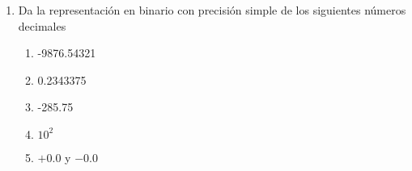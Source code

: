 \documentclass[11pt]{article}
\begin{document}
\begin{enumerate}
\begin{enumerate}
\item {}
\item {}
\end{enumerate}
\item Da la representación en binario con precisión simple de los siguientes números decimales
\begin{enumerate}
\item -9876.54321
\item 0.2343375
\item -285.75
\item $10^{2}$
\item $+0.0$ y $-0.0$
\end{enumerate}
\end{enumerate}
\end{document}
